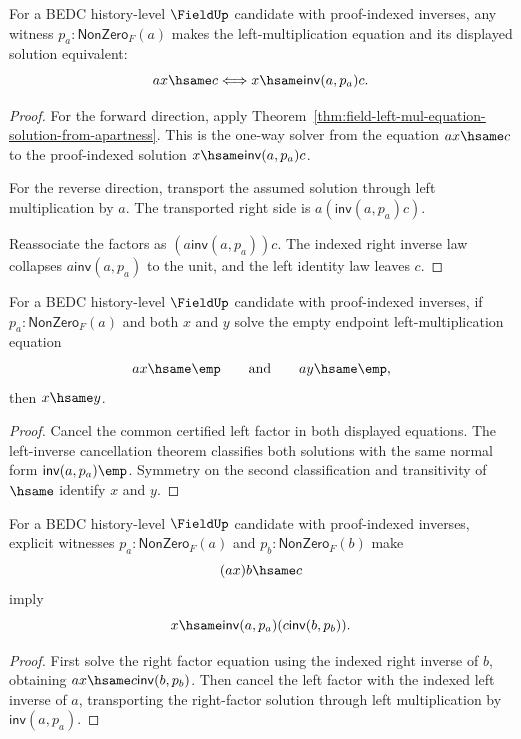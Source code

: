 \begin{theorem}
\label{thm:field-left-mul-equation-exact-from-apartness}
For a BEDC history-level $\FieldUp$ candidate with proof-indexed inverses,
any witness $p_a:\mathsf{NonZero}_F(a)$ makes the left-multiplication
equation and its displayed solution equivalent:
$$
a x\hsame c
\Longleftrightarrow
x\hsame \mathsf{inv}(a,p_a)c.
$$
\end{theorem}
\begin{proof}
For the forward direction, apply
Theorem~\ref{thm:field-left-mul-equation-solution-from-apartness}. This is
the one-way solver from the equation $a x\hsame c$ to the proof-indexed
solution $x\hsame \mathsf{inv}(a,p_a)c$.

For the reverse direction, transport the assumed solution through left
multiplication by $a$. The transported right side is
$a(\mathsf{inv}(a,p_a)c)$.

Reassociate the factors as $(a\mathsf{inv}(a,p_a))c$. The indexed right
inverse law collapses $a\mathsf{inv}(a,p_a)$ to the unit, and the left
identity law leaves $c$.
\end{proof}

\begin{theorem}
\label{thm:field-left-mul-empty-equation-solution-unique-from-apartness}
For a BEDC history-level $\FieldUp$ candidate with proof-indexed inverses, if
$p_a:\mathsf{NonZero}_F(a)$ and both $x$ and $y$ solve the empty endpoint
left-multiplication equation
$$
a x\hsame \emp
\qquad\text{and}\qquad
a y\hsame \emp,
$$
then $x\hsame y$.
\end{theorem}
\begin{proof}
Cancel the common certified left factor in both displayed equations. The
left-inverse cancellation theorem classifies both solutions with the same
normal form $\mathsf{inv}(a,p_a)\emp$. Symmetry on the second classification
and transitivity of $\hsame$ identify $x$ and $y$.
\end{proof}

\begin{theorem}
\label{thm:field-middle-mul-equation-solution-from-apartness}
For a BEDC history-level $\FieldUp$ candidate with proof-indexed inverses,
explicit witnesses $p_a:\mathsf{NonZero}_F(a)$ and
$p_b:\mathsf{NonZero}_F(b)$ make
$$
(a x)b\hsame c
$$
imply
$$
x\hsame \mathsf{inv}(a,p_a)(c\mathsf{inv}(b,p_b)).
$$
\end{theorem}
\begin{proof}
First solve the right factor equation using the indexed right inverse of $b$,
obtaining $a x\hsame c\mathsf{inv}(b,p_b)$. Then cancel the left factor
with the indexed left inverse of $a$, transporting the right-factor solution
through left multiplication by $\mathsf{inv}(a,p_a)$.
\end{proof}

